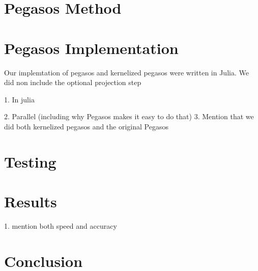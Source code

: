 \documentclass{article}
\begin{document}
\section{Pegasos Method}

\section{Pegasos Implementation}

Our implemtation of pegasos and kernelized pegasos were written in Julia. We did non include the optional projection step

1. In julia

2. Parallel (including why Pegasos makes it easy to do that)
3. Mention that we did both kernelized pegasos and the original Pegasos



\section{Testing}


\section{Results}
1. mention both speed and accuracy

\section{Conclusion}
\end{document}
